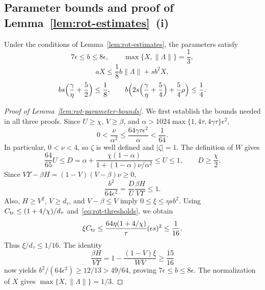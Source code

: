 \subsection{Parameter bounds and proof of Lemma~\ref{lem:rot-estimates}~(i)}
\label{app:lb-rotation-params-proof}
\begin{lemma}
\label{lem:rot-parameter-bounds}
Under the conditions of Lemma~\ref{lem:rot-estimates}, the parameters satisfy
\[
7\epsilon\le b\le8\epsilon,
\qquad \max\{X,\|\Lambda\|\}=\frac13,
\]
\[
aX\le\frac18b\|\Lambda\|+sb^2X,
\]
\[
bs\Bigl(\frac{\gamma}{\eta}+\frac52\Bigr)\le\frac18,
\qquad
b\Bigl(2s\Bigl(\frac{\gamma}{\eta}+\frac54\Bigr)+\frac54\rho\Bigr)\le\frac14.
\]
\end{lemma}

\begin{proof}[Proof of Lemma~\ref{lem:rot-parameter-bounds}]
We first establish the bounds needed in all three proofs. Since
\(U\ge\chi\), \(V\ge\beta\), and
\(\alpha>1024\max\{1,4\tau,4\gamma\tau\}\epsilon^2\),
\[
0<\frac\nu{\alpha^2}
\le\frac{64\gamma\tau\epsilon^2}{\alpha}<\frac1{64}.
\]
In particular, \(0<\nu<4\), so \(\zeta\) is well defined and
\(|\zeta|=1\). The definition of \(W\) gives
\[
\frac{64}{65}U\le
D=\alpha+\frac{\chi(1-\alpha)}{1+(1-\alpha)\nu/\alpha^2}
\le U\le1,
\qquad D\ge\frac\chi2.
\]
Since \(V\Upsilon-\beta H=(1-V)(V-\beta)\nu\ge0\),
\[
\frac{b^2}{64\epsilon^2}=\frac D U\frac{\beta H}{V\Upsilon}\le1.
\]
Also, \(H\ge V^2\), \(V\ge d_\tau\), and \(V-\beta\le V\) imply
\(0\le\xi\le\eta s b^2\). Using
\(C_{\rm tr}\le(1+4/\chi)/d_\tau\) and~\eqref{eq:rot-thresholds}, we obtain
\begin{equation}
\label{eq:rot-small-feedback}
\xi C_{\rm tr}
\le\frac{64\eta(1+4/\chi)}\tau(\epsilon s)^2
\le\frac1{16}.
\end{equation}
Thus \(\xi/d_\tau\le1/16\). The identity
\[
\frac{\beta H}{V\Upsilon}
=1-\frac{(1-V)\xi}{WV}\ge\frac{15}{16}
\]
now yields \(b^2/(64\epsilon^2)\ge12/13>49/64\), proving
\(7\epsilon\le b\le8\epsilon\).
The normalization of \(X\) gives \(\max\{X,\|\Lambda\|\}=1/3\).


\end{proof}

